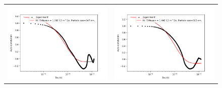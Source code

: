\begin{figure}[H]
  \noindent
  \centering
  \begin{longtable}{p{7cm}p{7cm}}
    \includegraphics[width=8cm]{Images/AutoCor_Hijau_Data10-01.png}
    &
    \includegraphics[width=8cm]{Images/AutoCor_Merah_Data9-01.png}
   
  \end{longtable}
\end{figure}
